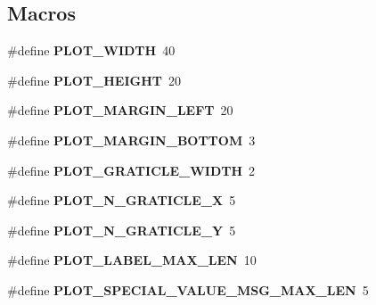 \subsection*{Macros}
\begin{DoxyCompactItemize}
\item 
\#define {\bfseries P\+L\+O\+T\+\_\+\+W\+I\+D\+TH}~40\hypertarget{bicorder-plotter_8h_a1fc4b17a5ce75463f2c6737654058dc9}{}\label{bicorder-plotter_8h_a1fc4b17a5ce75463f2c6737654058dc9}

\item 
\#define {\bfseries P\+L\+O\+T\+\_\+\+H\+E\+I\+G\+HT}~20\hypertarget{bicorder-plotter_8h_a2b49d5c686e9bd4f2ec6a3005eb798a5}{}\label{bicorder-plotter_8h_a2b49d5c686e9bd4f2ec6a3005eb798a5}

\item 
\#define {\bfseries P\+L\+O\+T\+\_\+\+M\+A\+R\+G\+I\+N\+\_\+\+L\+E\+FT}~20\hypertarget{bicorder-plotter_8h_a801b6f0ba4569299c3c6daf4e0defda5}{}\label{bicorder-plotter_8h_a801b6f0ba4569299c3c6daf4e0defda5}

\item 
\#define {\bfseries P\+L\+O\+T\+\_\+\+M\+A\+R\+G\+I\+N\+\_\+\+B\+O\+T\+T\+OM}~3\hypertarget{bicorder-plotter_8h_a2df60d2bc9bba913eb61dcf29214f6d3}{}\label{bicorder-plotter_8h_a2df60d2bc9bba913eb61dcf29214f6d3}

\item 
\#define {\bfseries P\+L\+O\+T\+\_\+\+G\+R\+A\+T\+I\+C\+L\+E\+\_\+\+W\+I\+D\+TH}~2\hypertarget{bicorder-plotter_8h_a58bdff8bea8d71f3d5b138d2b926ed76}{}\label{bicorder-plotter_8h_a58bdff8bea8d71f3d5b138d2b926ed76}

\item 
\#define {\bfseries P\+L\+O\+T\+\_\+\+N\+\_\+\+G\+R\+A\+T\+I\+C\+L\+E\+\_\+X}~5\hypertarget{bicorder-plotter_8h_afe7c4f9a4b7def188820c34befedd6c2}{}\label{bicorder-plotter_8h_afe7c4f9a4b7def188820c34befedd6c2}

\item 
\#define {\bfseries P\+L\+O\+T\+\_\+\+N\+\_\+\+G\+R\+A\+T\+I\+C\+L\+E\+\_\+Y}~5\hypertarget{bicorder-plotter_8h_ae49e5006579bd892974523899b206c1e}{}\label{bicorder-plotter_8h_ae49e5006579bd892974523899b206c1e}

\item 
\#define {\bfseries P\+L\+O\+T\+\_\+\+L\+A\+B\+E\+L\+\_\+\+M\+A\+X\+\_\+\+L\+EN}~10\hypertarget{bicorder-plotter_8h_aad7c802940ad17ae1b915ccef7f85d29}{}\label{bicorder-plotter_8h_aad7c802940ad17ae1b915ccef7f85d29}

\item 
\#define {\bfseries P\+L\+O\+T\+\_\+\+S\+P\+E\+C\+I\+A\+L\+\_\+\+V\+A\+L\+U\+E\+\_\+\+M\+S\+G\+\_\+\+M\+A\+X\+\_\+\+L\+EN}~5\hypertarget{bicorder-plotter_8h_a6b18117f2d9616dadc7b0d8cc04c4a0f}{}\label{bicorder-plotter_8h_a6b18117f2d9616dadc7b0d8cc04c4a0f}

\end{DoxyCompactItemize}
